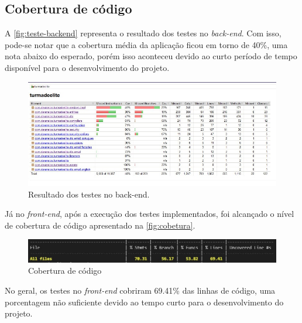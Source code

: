 \subsection{Cobertura de código}

A \autoref{fig:teste-backend} representa o resultado dos testes no \textit{\gls{back-end}}. Com isso, pode-se notar que a cobertura média da aplicação ficou em torno de 40\%, uma nota abaixo do esperado, porém isso aconteceu devido ao curto período de tempo disponível para o desenvolvimento do projeto.
\begin{figure}[htb]
    \centering
	\includegraphics[width=16cm]{imagens/TesteBackend.jpg}
	\caption{\label{fig:teste-backend} Resultado dos testes no back-end.}
\end{figure}

Já no \textit{\gls{front-end}}, após a execução dos testes implementados, foi alcançado o nível de cobertura de código apresentado na \autoref{fig:cobetura}.

\begin{figure}[htb]
    \centering
	\includegraphics[width=16cm]{imagens/ResultadoTestes.JPG}
	\caption{\label{fig:cobetura} Cobertura de código}
\end{figure}

No geral, os testes no \textit{\gls{front-end}} cobriram 69.41\% das linhas de código, uma  porcentagem não suficiente devido ao tempo curto para o desenvolvimento do projeto.
